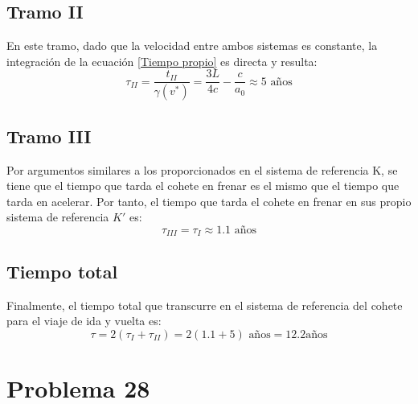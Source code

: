 \documentclass[11pt]{article}
\begin{document}
\subsection*{Tramo II}
En este tramo, dado que la velocidad entre ambos sistemas es constante, la integración de la ecuación \eqref{Tiempo propio} es directa y resulta: 
\begin{equation}
    \tau_{II} = \dfrac{t_{II}}{\gamma(v^*)}=\dfrac{3L}{4c} - \dfrac{c}{a_0} \approx 5 \textrm{ años}
\end{equation}
\subsection*{Tramo III}
Por argumentos similares a los proporcionados en el sistema de referencia K, se tiene que el tiempo que tarda el cohete en frenar es el mismo que el tiempo que tarda en acelerar. Por tanto, el tiempo que tarda el cohete en frenar en sus propio sistema de referencia $K'$ es:
\begin{equation}
    \tau_{III} = \tau_I \approx 1.1 \textrm{ años}
\end{equation}
\subsection*{Tiempo total}
Finalmente, el tiempo total que transcurre en el sistema de referencia del cohete para el viaje de ida y vuelta es:
\begin{equation}
    \tau = 2(\tau_I + \tau_{II}) = 2(1.1 + 5) \textrm{ años} = 12.2 \textrm{años} 
\end{equation}
\section*{Problema 28}
\end{document}
